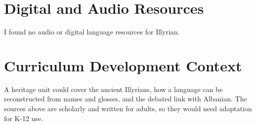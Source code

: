 \documentclass[12pt]{article}
\begin{document}
\section{Digital and Audio Resources}
I found no audio or digital language resources for Illyrian.

\section{Curriculum Development Context}
A heritage unit could cover the ancient Illyrians, how a language can be reconstructed from names and glosses, and the debated link with Albanian. The sources above are scholarly and written for adults, so they would need adaptation for K-12 use.
\end{document}
